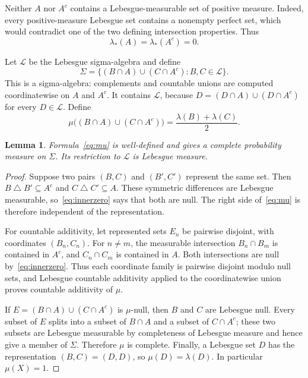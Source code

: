 \documentclass[11pt]{amsart}
\newtheorem{lemma}[theorem]{Lemma}
\theoremstyle{definition}
\newcommand{\Leb}{\mathcal L}
\begin{document}
Neither $A$ nor $A^c$ contains a Lebesgue-measurable set of positive measure.
Indeed, every positive-measure Lebesgue set contains a nonempty perfect set,
which would contradict one of the two defining intersection properties.
Thus
\begin{equation}\label{eq:innerzero}
 \lambda_*(A)=\lambda_*(A^c)=0.
\end{equation}

Let $\Leb$ be the Lebesgue sigma-algebra and define
\[
 \Sigma=
 \bigl\{(B\cap A)\cup(C\cap A^c):B,C\in\Leb\bigr\}.
\]
This is a sigma-algebra: complements and countable unions are computed
coordinatewise on $A$ and $A^c$.  It contains $\Leb$, because
$D=(D\cap A)\cup(D\cap A^c)$ for every $D\in\Leb$.  Define
\begin{equation}\label{eq:mu}
 \mu\bigl((B\cap A)\cup(C\cap A^c)\bigr)
 =\frac{\lambda(B)+\lambda(C)}2.
\end{equation}

\begin{lemma}\label{lem:measure}
Formula~\eqref{eq:mu} is well-defined and gives a complete probability
measure on $\Sigma$.  Its restriction to $\Leb$ is Lebesgue measure.
\end{lemma}

\begin{proof}
Suppose two pairs $(B,C)$ and $(B',C')$ represent the same set.  Then
$B\mathbin\triangle B'\subseteq A^c$ and
$C\mathbin\triangle C'\subseteq A$.  These symmetric differences are
Lebesgue measurable, so~\eqref{eq:innerzero} says that both are null.  The
right side of~\eqref{eq:mu} is therefore independent of the representation.

For countable additivity, let represented sets $E_n$ be pairwise disjoint,
with coordinates $(B_n,C_n)$.  For $n\ne m$, the measurable intersection
$B_n\cap B_m$ is contained in $A^c$, and $C_n\cap C_m$ is contained in $A$.
Both intersections are null by~\eqref{eq:innerzero}.  Thus each coordinate
family is pairwise disjoint modulo null sets, and Lebesgue countable
additivity applied to the coordinatewise union proves countable additivity
of $\mu$.

If $E=(B\cap A)\cup(C\cap A^c)$ is $\mu$-null, then $B$ and $C$ are
Lebesgue null.  Every subset of $E$ splits into a subset of $B\cap A$ and a
subset of $C\cap A^c$; these two subsets are Lebesgue measurable by
completeness of Lebesgue measure and hence give a member of $\Sigma$.
Therefore $\mu$ is complete.  Finally, a Lebesgue set $D$ has the
representation $(B,C)=(D,D)$, so $\mu(D)=\lambda(D)$.  In particular
$\mu(X)=1$.
\end{proof}
\end{document}
